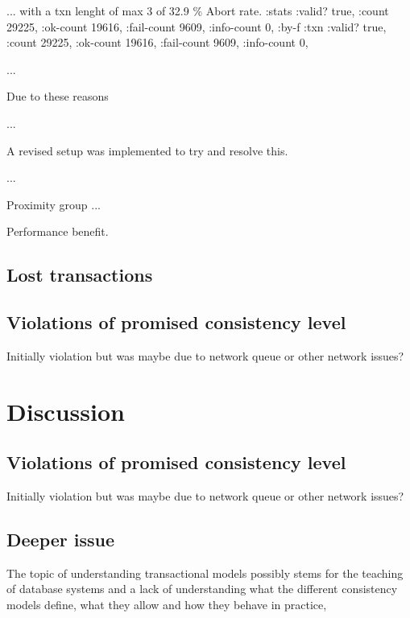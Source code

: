 \documentclass[a4paper,10pt,titlepage]{report}
\begin{document}
    ...
    with a txn lenght of max 3 of 32.9 \% Abort rate.
     :stats {:valid? true,
         :count 29225,
         :ok-count 19616,
         :fail-count 9609,
         :info-count 0,
         :by-f {:txn {:valid? true,
                      :count 29225,
                      :ok-count 19616,
                      :fail-count 9609,
                      :info-count 0}}},
                      
    
    
    
    
    ...

    Due to these reasons

    ...

    A revised setup was implemented to try and resolve this.

    ...

    Proximity group
    ...


    Performance benefit.

    \subsection{Lost transactions}

    \subsection{Violations of promised consistency level}
    Initially violation but was maybe due to network queue or other network issues?


    \section{Discussion}

    \subsection{Violations of promised consistency level}

    Initially violation but was maybe due to network queue or other network issues?


    \subsection{Deeper issue}
    The topic of understanding transactional models possibly stems for the teaching of database systems and a lack of understanding what the different consistency models define, what they allow and how they behave in practice,
\end{document}

